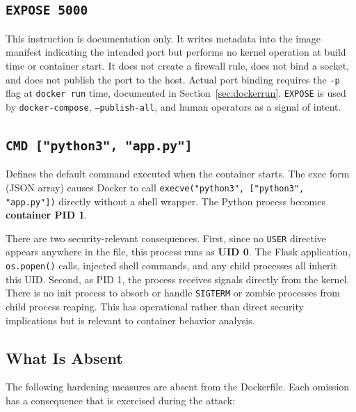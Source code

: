 \subsection*{\texttt{EXPOSE 5000}}

This instruction is documentation only. It writes metadata into the image manifest indicating the intended port but performs no kernel operation at build time or container start. It does not create a firewall rule, does not bind a socket, and does not publish the port to the host. Actual port binding requires the \texttt{-p} flag at \texttt{docker run} time, documented in Section~\ref{sec:dockerrun}. \texttt{EXPOSE} is used by \texttt{docker-compose}, \texttt{--publish-all}, and human operators as a signal of intent.

\subsection*{\texttt{CMD ["python3", "app.py"]}}

Defines the default command executed when the container starts. The exec form (JSON array) causes Docker to call \texttt{execve("python3", ["python3", "app.py"])} directly without a shell wrapper. The Python process becomes \textbf{container PID 1}.

There are two security-relevant consequences. First, since no \texttt{USER} directive appears anywhere in the file, this process runs as \textbf{UID 0}. The Flask application, \texttt{os.popen()} calls, injected shell commands, and any child processes all inherit this UID. Second, as PID 1, the process receives signals directly from the kernel. There is no init process to absorb or handle \texttt{SIGTERM} or zombie processes from child process reaping. This has operational rather than direct security implications but is relevant to container behavior analysis.

\subsection*{What Is Absent}

The following hardening measures are absent from the Dockerfile. Each omission has a consequence that is exercised during the attack:

